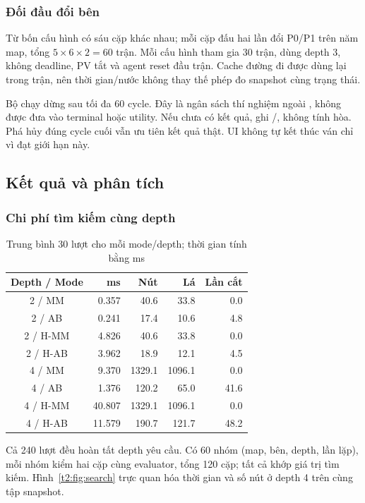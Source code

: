 \subsubsection{Đối đầu đổi bên}
Từ bốn cấu hình có sáu cặp khác nhau; mỗi cặp đấu hai lần đổi P0/P1
trên năm map, tổng $5\times6\times2=60$ trận. Mỗi cấu hình tham gia
30 trận, dùng depth 3, không deadline, PV tắt và agent reset đầu trận.
Cache đường đi được dùng lại trong trận, nên thời gian/nước không
thay thế phép đo snapshot cùng trạng thái.

Bộ chạy dừng sau tối đa 60 cycle. Đây là ngân sách thí nghiệm ngoài
, không được đưa vào terminal hoặc utility. Nếu chưa
có kết quả, ghi /, không tính hòa.
Phá hủy đúng cycle cuối vẫn ưu tiên kết quả thật. UI không tự kết
thúc ván chỉ vì đạt giới hạn này.

\subsection{Kết quả và phân tích}
\subsubsection{Chi phí tìm kiếm cùng depth}
\begin{table}[t]
\caption{Trung bình 30 lượt cho mỗi mode/depth; thời gian tính bằng ms}
\label{t2:tab:search}
\centering\small
\begin{tabular}{crrrr}
\toprule
Depth / Mode & ms & Nút & Lá & Lần cắt\\
\midrule
2 / MM & 0.357 & 40.6 & 33.8 & 0.0\\
2 / AB & 0.241 & 17.4 & 10.6 & 4.8\\
2 / H-MM & 4.826 & 40.6 & 33.8 & 0.0\\
2 / H-AB & 3.962 & 18.9 & 12.1 & 4.5\\
\midrule
4 / MM & 9.370 & 1329.1 & 1096.1 & 0.0\\
4 / AB & 1.376 & 120.2 & 65.0 & 41.6\\
4 / H-MM & 40.807 & 1329.1 & 1096.1 & 0.0\\
4 / H-AB & 11.579 & 190.7 & 121.7 & 48.2\\
\bottomrule
\end{tabular}
\end{table}

Cả 240 lượt đều hoàn tất depth yêu cầu. Có 60 nhóm (map, bên,
depth, lần lặp), mỗi nhóm kiểm hai cặp cùng evaluator, tổng 120 cặp;
tất cả khớp giá trị tìm kiếm. Hình~\ref{t2:fig:search} trực quan hóa
thời gian và số nút ở depth 4 trên cùng tập snapshot.

